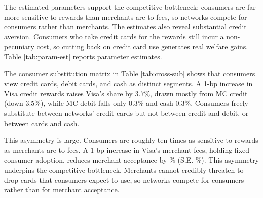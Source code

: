 \documentclass[main.tex]{subfiles}
\begin{document}
\begin{table}
    \small
    \caption{Estimated consumer own-reward and cross-reward~semi-elasticities.}
    \label{tab:cross-sub}
    \vspace{-0.2in}
    \begin{center}
        
    \end{center}
\end{table}

The estimated parameters support the competitive bottleneck: consumers are far more sensitive to rewards than merchants are to fees, so networks compete for consumers rather than merchants.
The estimates also reveal substantial credit aversion. Consumers who take credit cards for the rewards still incur a non-pecuniary cost, so cutting back on credit card use generates real welfare gains.
Table \ref{tab:param-est} reports parameter estimates.

The consumer substitution matrix in Table \ref{tab:cross-sub} shows that consumers view credit cards, debit cards, and cash as distinct segments.
A 1-bp increase in Visa credit rewards raises Visa's share by $3.7\%$, drawn mostly from MC credit (down $3.5\%$), while MC debit falls only $0.3\%$ and cash $0.3\%$.
Consumers freely substitute between networks' credit cards but not between credit and debit, or between cards and cash.

This asymmetry is large. Consumers are roughly ten times as sensitive to rewards as merchants are to fees.
A $1$-bp increase in Visa's merchant fees, holding fixed consumer adoption, reduces merchant acceptance by $\%$ (S.E. $\%$).
This asymmetry underpins the competitive bottleneck.
Merchants cannot credibly threaten to drop cards that consumers expect to use, so networks compete for consumers rather than for merchant acceptance.
\end{document}
